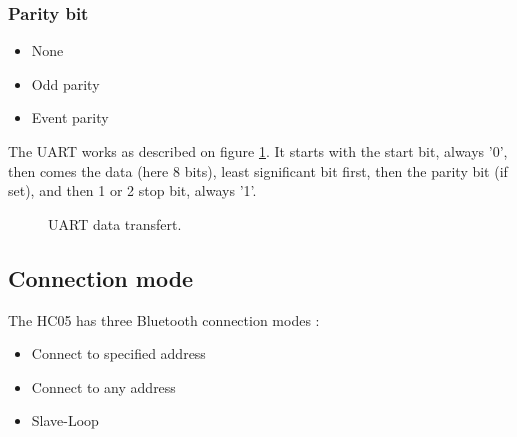 \documentclass[11pt]{article}
\begin{document}
\subsubsection{Parity bit}
\begin{itemize}
    \item None
    \item Odd parity
    \item Event parity
\end{itemize}

The UART works as described on figure \ref{UART_data_transfert}. It starts with the start bit, always '0', then comes the data (here 8 bits), least significant bit first, then the parity bit (if set), and then 1 or 2 stop bit, always '1'.
\begin{figure}[H]
        \caption{UART data transfert.}
        \label{UART_data_transfert}
\end{figure}
\subsection{Connection mode}
The HC05 has three Bluetooth connection modes :
\begin{itemize}
    \item Connect to specified address
    \item Connect to any address
    \item Slave-Loop
\end{itemize}
\end{document}
